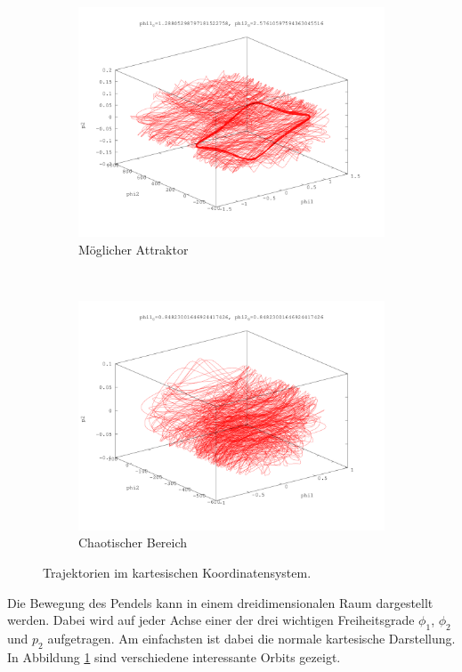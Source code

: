 \begin{figure}
\begin{subfigure}[b]{0.3\textwidth}
                \includegraphics[width=\textwidth]{images/phasenraeume/phi2_is_2_phi1_82.png}
                \caption{Möglicher Attraktor}
        \end{subfigure}
        ~
        \begin{subfigure}[b]{0.3\textwidth}
                \centering
                \includegraphics[width=\textwidth]{images/phasenraeume/phi1_is_phi2_54.png}
                \caption{Chaotischer Bereich}
        \end{subfigure}
        \caption{Trajektorien im kartesischen Koordinatensystem.}
        \label{fig:trajektorien_kartesisch}
\end{figure}

Die Bewegung des Pendels kann in einem dreidimensionalen Raum dargestellt werden.
Dabei wird auf jeder Achse einer der drei wichtigen Freiheitsgrade $\phi_1$, $\phi_2$ und $p_2$ aufgetragen.
Am einfachsten ist dabei die normale kartesische Darstellung.
In Abbildung \ref{fig:trajektorien_kartesisch} sind verschiedene interessante Orbits gezeigt.

